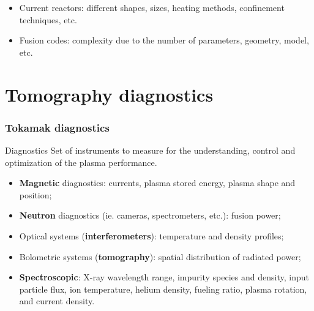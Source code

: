 \documentclass[10pt]{beamer}
\begin{document}
\begin{frame}
\begin{columns}
\end{columns}

\begin{itemize}%
	\item Current reactors: different shapes, sizes, heating methods, confinement techniques, etc.
\end{itemize}
\vspace{-0.2cm}
\begin{itemize}%
	\item \alert{Fusion codes:} complexity due to the number of parameters, geometry, model, etc.
\end{itemize}
\end{frame}


\section{Tomography diagnostics}


\begin{frame}
\frametitle{Tokamak diagnostics}
    
\begin{alertblock}{Diagnostics}
Set of instruments to measure for the understanding, control and optimization of the plasma performance.
\end{alertblock}

\begin{itemize}
\item \textbf{Magnetic} diagnostics: currents, plasma stored energy, plasma shape and position;

\item \textbf{Neutron} diagnostics (ie. cameras, spectrometers, etc.): fusion power;

\item Optical systems (\textbf{interferometers}): temperature and density profiles;

\item Bolometric systems (\textbf{tomography}): spatial distribution of radiated power;

\item \textbf{Spectroscopic}: X-ray wavelength range, impurity species and density, input particle flux, ion temperature, helium density, fueling ratio, plasma rotation, and current density.


\end{itemize}

\end{frame}
\end{document}
